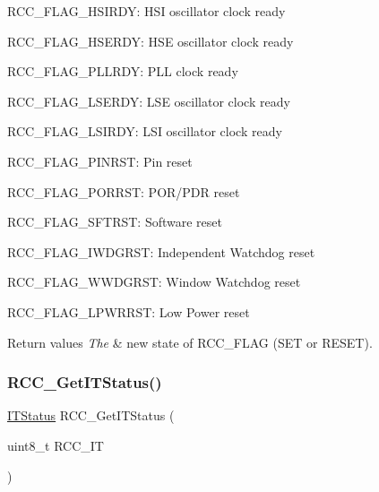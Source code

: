 \begin{DoxyItemize}
\item R\+C\+C\+\_\+\+F\+L\+A\+G\+\_\+\+H\+S\+I\+R\+DY\+: H\+SI oscillator clock ready \item R\+C\+C\+\_\+\+F\+L\+A\+G\+\_\+\+H\+S\+E\+R\+DY\+: H\+SE oscillator clock ready \item R\+C\+C\+\_\+\+F\+L\+A\+G\+\_\+\+P\+L\+L\+R\+DY\+: P\+LL clock ready \item R\+C\+C\+\_\+\+F\+L\+A\+G\+\_\+\+L\+S\+E\+R\+DY\+: L\+SE oscillator clock ready \item R\+C\+C\+\_\+\+F\+L\+A\+G\+\_\+\+L\+S\+I\+R\+DY\+: L\+SI oscillator clock ready \item R\+C\+C\+\_\+\+F\+L\+A\+G\+\_\+\+P\+I\+N\+R\+ST\+: Pin reset \item R\+C\+C\+\_\+\+F\+L\+A\+G\+\_\+\+P\+O\+R\+R\+ST\+: P\+O\+R/\+P\+DR reset \item R\+C\+C\+\_\+\+F\+L\+A\+G\+\_\+\+S\+F\+T\+R\+ST\+: Software reset \item R\+C\+C\+\_\+\+F\+L\+A\+G\+\_\+\+I\+W\+D\+G\+R\+ST\+: Independent Watchdog reset \item R\+C\+C\+\_\+\+F\+L\+A\+G\+\_\+\+W\+W\+D\+G\+R\+ST\+: Window Watchdog reset \item R\+C\+C\+\_\+\+F\+L\+A\+G\+\_\+\+L\+P\+W\+R\+R\+ST\+: Low Power reset\end{DoxyItemize}

\begin{DoxyRetVals}{Return values}
{\em The} & new state of R\+C\+C\+\_\+\+F\+L\+AG (S\+ET or R\+E\+S\+ET). \\
\hline
\end{DoxyRetVals}
\mbox{\label{group___r_c_c___private___functions_ga6126c99f398ee4be410ad76ae3aee18f}} 
\subsubsection{\texorpdfstring{RCC\_GetITStatus()}{RCC\_GetITStatus()}}
{\footnotesize\ttfamily \mbox{\hyperlink{group___exported__types_gaacbd7ed539db0aacd973a0f6eca34074}{I\+T\+Status}} R\+C\+C\+\_\+\+Get\+I\+T\+Status (\begin{DoxyParamCaption}\item[{uint8\+\_\+t}]{R\+C\+C\+\_\+\+IT }\end{DoxyParamCaption})}



